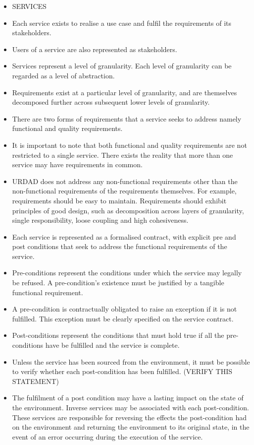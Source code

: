\begin{itemize}
\begin{itemize}
\begin{itemize}
				\item SERVICES
					\item Each service exists to realise a use case and fulfil the requirements of its stakeholders.
					\item Users of a service are also represented as stakeholders.
					\item Services represent a level of granularity. Each level of granularity can be regarded as a level of abstraction.
					\item Requirements exist at a particular level of granularity, and are themselves decomposed further across subsequent lower levels of granularity.
					\item There are two forms of requirements that a service seeks to address namely functional and quality requirements.
					\item It is important to note that both functional and quality requirements are not restricted to a single service. There exists the reality that more than one service may have requirements in common.
					\item URDAD does not address any non-functional requirements other than the non-functional requirements of the requirements themselves. For example, requirements should be easy to maintain. Requirements should exhibit principles of good design, such as decomposition across layers of granularity, single responsibility, loose coupling and high cohesiveness.
					\item Each service is represented as a formalised contract, with explicit pre and post conditions that seek to address the functional requirements of the service.
					\item Pre-conditions represent the conditions under which the service may legally be refused. A pre-condition's existence must be justified by a tangible functional requirement. 
					\item A pre-condition is contractually obligated to raise an exception if it is not fulfilled. This exception must be clearly specified on the service contract.
					\item Post-conditions represent the conditions that must hold true if all the pre-conditions have be fulfilled and the service is complete.
					\item Unless the service has been sourced from the environment, it must be possible to verify whether each post-condition has been fulfilled. (VERIFY THIS STATEMENT)
					\item The fulfilment of a post condition may have a lasting impact on the state of the environment. Inverse services may be associated with each post-condition. These services are responsible for reversing the effects the post-condition had on the environment and returning the environment to its original state, in the event of an error occurring during the execution of the service.

\end{itemize}
\end{itemize}
\end{itemize}

